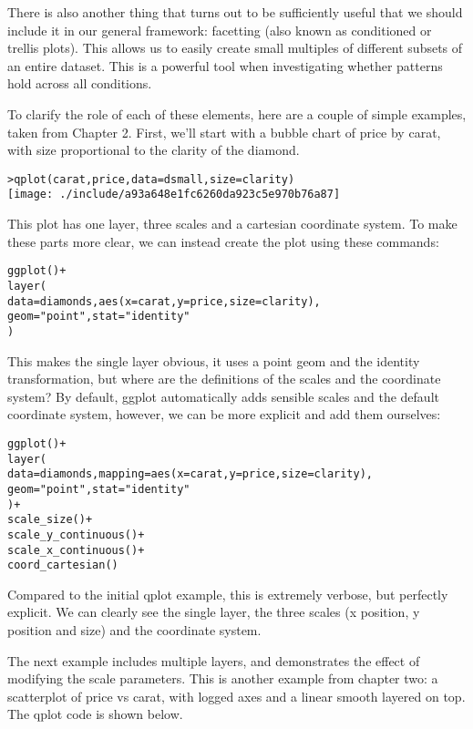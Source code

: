 There is also another thing that turns out to be sufficiently useful that we should include it in our general framework: facetting (also known as conditioned or trellis plots). This allows us to easily create small multiples of different subsets of an entire dataset. This is a powerful tool when investigating whether patterns hold across all conditions.

To clarify the role of each of these elements, here are a couple of simple examples, taken from Chapter 2.  First, we'll start with a bubble chart of price by carat, with size proportional to the clarity of the diamond.

\begin{alltt}
> qplot(carat, price, data = dsmall, size = clarity)
\texttt{[image: ./include/a93a648e1fc6260da923c5e970b76a87]}

\end{alltt}

This plot has one layer, three scales and a cartesian coordinate system.  To make these parts more clear, we can instead create the plot using these commands:

\begin{alltt}
ggplot() + 
layer(
  data = diamonds, aes(x = carat, y = price, size = clarity),
  geom = "point", stat = "identity"
)
\end{alltt}

This makes the single layer obvious, it uses a point geom and the identity transformation, but where are the definitions of the scales and the coordinate system?  By default, ggplot automatically adds sensible scales and the default coordinate system, however, we can be more explicit and add them ourselves:

\begin{alltt}
ggplot() + 
layer(
  data = diamonds, mapping = aes(x = carat, y = price, size = clarity),
  geom = "point", stat = "identity"
) + 
scale_size() + 
scale_y_continuous() + 
scale_x_continuous() + 
coord_cartesian()
\end{alltt}

Compared to the initial qplot example, this is extremely verbose, but perfectly explicit.  We  can clearly see the single layer, the three scales (x position, y position and size) and the coordinate system.  

The next example includes multiple layers, and demonstrates the effect of modifying the scale parameters.  This is another example from chapter two: a scatterplot of price vs carat, with logged axes and a linear smooth layered on top.  The qplot code is shown below.


